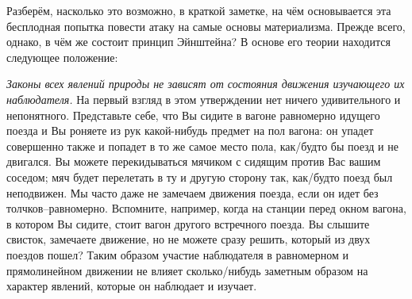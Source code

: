Разберём, насколько это возможно, в краткой заметке, на чём основывается эта бесплодная попытка повести атаку на самые основы материализма. Прежде всего, однако, в чём же состоит принцип Эйнштейна? В основе его теории находится следующее положение:

\emph{Законы всех явлений природы не зависят от состояния движения изучающего их наблюдателя.} На первый взгляд в этом утверждении нет ничего удивительного и непонятного. Представьте себе, что Вы сидите в вагоне равномерно идущего поезда и Вы роняете из рук какой-нибудь предмет на пол вагона: он упадет совершенно также и попадет в то же самое место пола, как\-/будто бы поезд и не двигался. Вы можете перекидываться мячиком с сидящим против Вас вашим соседом; мяч будет перелетать в ту и другую сторону так, как\-/будто поезд был неподвижен. Мы часто даже не замечаем движения поезда, если он идет без толчков\---равномерно. Вспомните, например, когда на станции перед окном вагона, в котором Вы сидите, стоит вагон другого встречного поезда. Вы слышите свисток, замечаете движение, но не можете сразу решить, который из двух поездов пошел? Таким образом участие наблюдателя в равномерном и прямолинейном движении не влияет сколько\-/нибудь заметным образом на характер явлений, которые он наблюдает и изучает.

